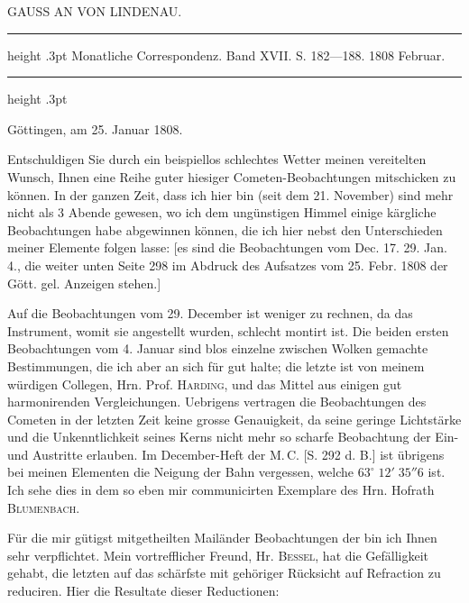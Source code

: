 \par\bigskip
{}
\hypertarget{native-301-lower}{}
\begin{center}\large GAUSS AN VON LINDENAU.\end{center}
\begin{center}\parbox{.87\linewidth}{\centering\footnotesize\frenchspacing
\hrule height .3pt\relax\vspace{2.5pt}
Monatliche Correspondenz. Band XVII. S. 182—188. 1808 Februar.\par
\vspace{2.5pt}\hrule height .3pt\relax
}\end{center}

\begin{flushright}
Göttingen, am 25. Januar 1808.
\end{flushright}

\par\indent Entschuldigen Sie durch ein beispiellos schlechtes Wetter meinen vereitelten Wunsch, Ihnen
eine Reihe guter hiesiger Cometen-Beobachtungen mitschicken zu können. In der ganzen Zeit,
dass ich hier bin (seit dem 21. November) sind mehr nicht als 3 Abende gewesen, wo ich dem
ungünstigen Himmel einige kärgliche Beobachtungen habe abgewinnen können, die ich hier
nebst den Unterschieden meiner Elemente folgen lasse: [es sind die Beobachtungen vom
Dec. 17. 29. Jan. 4., die weiter unten Seite 298 im Abdruck des Aufsatzes vom 25. Febr.
1808 der Gött. gel. Anzeigen stehen.]

\par\indent Auf die Beobachtungen vom 29. December ist weniger zu rechnen, da das Instrument, womit
sie angestellt wurden, schlecht montirt ist. Die beiden ersten Beobachtungen vom 4. Januar
sind blos einzelne zwischen Wolken gemachte Bestimmungen, die ich aber an sich für gut
halte; die letzte ist von meinem würdigen Collegen, Hrn. Prof. \textsc{Harding}, und das Mittel aus
einigen gut harmonirenden Vergleichungen. Uebrigens vertragen die Beobachtungen des
Cometen in der letzten Zeit keine grosse Genauigkeit, da seine geringe Lichtstärke und die
Unkenntlichkeit seines Kerns nicht mehr so scharfe Beobachtung der Ein- und Austritte
erlauben. Im December-Heft der M.\,C. [S. 292 d. B.] ist übrigens bei meinen Elementen die
Neigung der Bahn vergessen, welche $63^\circ\;12'\;35''6$ ist. Ich sehe dies in dem so
eben mir communicirten Exemplare des Hrn. Hofrath \textsc{Blumenbach}.

\par\indent Für die mir gütigst mitgetheilten Mailänder Beobachtungen der \VestaAltarThreeOhOne{} bin ich Ihnen sehr verpflichtet. Mein vortrefflicher Freund, Hr. \textsc{Bessel}, hat die
Gefälligkeit gehabt, die letzten auf das schärfste mit gehöriger Rücksicht auf Refraction
zu reduciren. Hier die Resultate dieser Reductionen:


